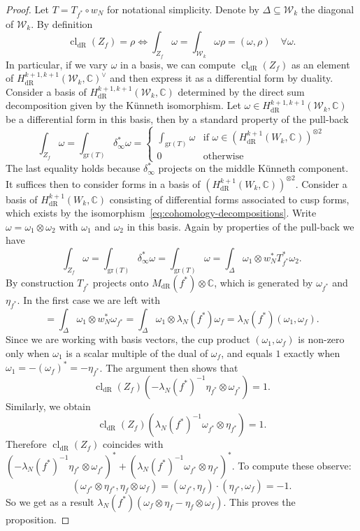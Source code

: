 \documentclass[10pt,a4paper]{amsart}
\newcommand{\KS}{\mathscr{W}}
\newcommand{\C}{\numberset{C}}
\DeclareMathOperator{\cl}{cl}
\DeclareMathOperator{\dR}{dR}
\newcommand{\numberset}{\mathbb}
\begin{document}
\begin{proof}
    Let $T = T_{f^*} \circ w_N$ for notational simplicity. Denote by $\Delta \subseteq \KS_k$ the diagonal of $\KS_k$. By definition
    \[
        \cl_{\dR}(Z_f) = \rho \iff \int_{Z_f} \omega = \int_{\KS_k} \omega\rho = (\omega,\rho) \quad \forall \omega.
    \]
    In particular, if we vary $\omega$ in a basis, we can compute $\cl_{\dR}(Z_f)$ as an element of $H^{k+1,k+1}_{\dR}(\KS_k,\C)^{\vee}$ and then express it as a differential form by duality.
    Consider a basis of $H^{k+1,k+1}_{\dR}(\KS_k,\C)$ determined by the direct sum decomposition given by the Künneth isomorphism. Let $\omega \in H^{k+1,k+1}_{\dR}(\KS_k,\C)$ be a differential form in this basis, then by a standard property of the pull-back
    \[
        \int_{Z_f} \omega = \int_{\mathrm{gr}(T)} \delta_{\infty}^* \omega = \begin{cases}
            \int_{\mathrm{gr}(T)}\omega &\text{if $\omega \in (H^{k+1}_{\dR}(W_k,\C))^{\otimes 2}$} \\
            0 &\text{otherwise}
        \end{cases}
    \]
    The last equality holds because $\delta_{\infty}^*$ projects on the middle Künneth component. It suffices then to consider forms in a basis of $(H^{k+1}_{\dR}(W_k,\C))^{\otimes 2}$. Consider a basis of $H^{k+1}_{\dR}(W_k,\C)$ consisting of differential forms associated to cusp forms, which exists by the isomorphism~\eqref{eq:cohomology-decompositions}.
    Write $\omega = \omega_1 \otimes \omega_2$ with $\omega_1$ and $\omega_2$ in this basis. Again by properties of the pull-back we have
    \[
        \int_{Z_f} \omega = \int_{\mathrm{gr}(T)} \delta_{\infty}^* \omega = \int_{\mathrm{gr}(T)} \omega = \int_{\Delta} \omega_1 \otimes w_N^* T_{f^*}^* \omega_2.
    \]
    By construction $T_{f^*}$ projects onto $M_{\dR}(f^*)\otimes \C$, which is generated by $\omega_{f^*}$ and $\eta_{f^*}$. In the first case we are left with
    \[
     = \int_{\Delta} \omega_1 \otimes w_N^* \omega_{f^*} = \int_{\Delta} \omega_1 \otimes \lambda_N(f^*)\omega_f = \lambda_N(f^*)(\omega_1,\omega_f).
    \]
 Since we are working with basis vectors, the cup product $(\omega_1,\omega_f)$ is non-zero only when $\omega_1$ is a scalar multiple of the dual of $\omega_f$, and equals $1$ exactly when $\omega_1 = -(\omega_f)^* = -\eta_{f^*}$. The argument then shows that
   \[
     \cl_{\dR}(Z_f)(-\lambda_N(f^*)^{-1}\eta_{f^*}\otimes\omega_{f^*}) = 1. \]
  Similarly, we obtain
  \[\cl_{\dR}(Z_f)(\lambda_N(f^*)^{-1}\omega_{f^*}\otimes\eta_{f^*}) = 1.\]
 Therefore $\cl_{\dR}(Z_f)$ coincides with $(-\lambda_N(f^*)^{-1}\eta_{f^*} \otimes \omega_{f^*})^* + (\lambda_N(f^*)^{-1}\omega_{f^*} \otimes \eta_{f^*})^*$. To compute these observe:
    \[
        (\omega_{f^*}\otimes \eta_{f^*},\eta_f\otimes \omega_f) = (\omega_{f^*},\eta_f)\cdot (\eta_{f^*},\omega_f) = -1.
    \]
 So we get as a result $\lambda_N(f^*)(\omega_f \otimes \eta_f -\eta_f\otimes \omega_f )$. This proves the proposition.
\end{proof}
\end{document}
